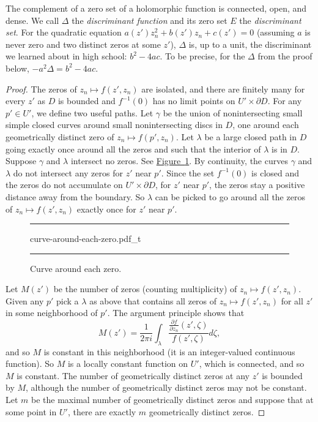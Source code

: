 \documentclass[12pt,openany]{book}
\newcommand{\myindex}[1]{#1\index{#1}}
\theoremstyle{plain}
\theoremstyle{remark}
\theoremstyle{definition}
\newenvironment{myfig}{%
\begin{figure}[h!t]
\noindent\rule{\textwidth}{0.5pt}\vspace{12pt}\par\centering}%
{\par\noindent\rule{\textwidth}{0.5pt}
\end{figure}}
\theoremstyle{exercise}
\theoremstyle{example}
\newcommand{\figureref}[1]{\hyperref[#1]{Figure~\ref*{#1}}}
\begin{document}
The complement of a zero set of a holomorphic function is connected,
open, and dense.
We call $\Delta$ the \emph{\myindex{discriminant function}} and its zero set
$E$ the \emph{\myindex{discriminant set}}.
For the quadratic equation $a(z') z_n^2 + b(z') z_n + c(z') = 0$ (assuming
$a$ is never zero and two distinct zeros at some $z'$),
$\Delta$ is, up to a unit, the discriminant we learned about in high school:
$b^2-4ac$.  To be precise, for the $\Delta$ from the proof below,
$-a^2 \Delta = b^2-4ac$.

\begin{proof}
The zeros of $z_n \mapsto f(z',z_n)$ are isolated, and there are finitely
many for every $z'$ as $D$ is bounded and $f^{-1}(0)$ has no limit points on
$U' \times \partial D$.
For any $p' \in U'$, we define two useful paths.
Let $\gamma$ be the union of nonintersecting
small simple closed curves around small nonintersecting discs
in $D$, one around each geometrically distinct zero of $z_n \mapsto f(p',z_n)$.
Let $\lambda$ be a large closed path in $D$ going
exactly once around all the zeros and such that the interior of $\lambda$ is
in $D$.
Suppose $\gamma$ and $\lambda$ intersect no zeros.
See \figureref{fig:curve-around-each-zero}.
By continuity, the curves $\gamma$
and $\lambda$ do not intersect any zeros for $z'$ near $p'$.
Since the set $f^{-1}(0)$ is closed and the zeros
do not
accumulate on $U' \times \partial D$,
for $z'$ near $p'$, the zeros stay a positive distance away from
the boundary.  So $\lambda$ can be picked to go
around all the zeros of $z_n \mapsto f(z',z_n)$ exactly once for $z'$ near $p'$.

\begin{myfig}
{curve-around-each-zero.pdf_t}
\caption{Curve around each zero.\label{fig:curve-around-each-zero}}
\end{myfig}

Let $M(z')$ be the number of zeros (counting multiplicity) of 
$z_n \mapsto f(z',z_n)$.
Given any $p'$
pick a $\lambda$ as above that contains all zeros
of $z_n \mapsto f(z',z_n)$ for all $z'$ in some neighborhood of $p'$.
The argument principle shows that
\begin{equation*}
M(z') = \frac{1}{2\pi i}
\int_{\lambda}
\frac{\frac{\partial f}{\partial z_n}(z',\zeta)}{f(z',\zeta)} d\zeta ,
\end{equation*}
and so $M$ is constant in this neighborhood (it is an integer-valued
continuous function).
So $M$ is a locally constant function on $U'$,
which is connected, and so $M$ is constant.
The number of
geometrically distinct zeros at any $z'$ is bounded by $M$,
although the number of geometrically distinct zeros may not be constant.
Let $m$ be the maximal
number of geometrically distinct zeros and suppose that at some point
in $U'$, there are exactly $m$ geometrically distinct zeros.


\end{proof}
\end{document}
